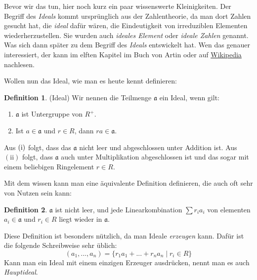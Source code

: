 \documentclass{article}
\theoremstyle{definition}
\newtheorem*{definition}{Definition}
\theoremstyle{remark}
\begin{document}
\vspace{0.7em}
Bevor wir das tun, hier noch kurz ein paar wissenswerte Kleinigkeiten. Der Begriff des \emph{Ideals} kommt
ursprünglich aus der Zahlentheorie, da man dort Zahlen gesucht hat, die \emph{ideal} dafür wären, die
Eindeutigkeit von irreduziblen Elementen wiederherzustellen. Sie wurden auch \emph{ideales Element} oder
\emph{ideale Zahlen} genannt. Was sich dann später zu dem Begriff des \emph{Ideals} entswickelt hat. Wen das
genauer interessiert, der kann im elften Kapitel im Buch von Artin oder auf
\href{https://de.wikipedia.org/wiki/Ideal_(Ringtheorie)#%E2%80%9EIdeale_Zahlen%E2%80%9C}{Wikipedia} nachlesen.

\vspace{0.7em}
Wollen nun das Ideal, wie man es heute kennt definieren:

\begin{definition}(Ideal) Wir nennen die Teilmenge $\mathfrak a$ ein Ideal, wenn gilt:
\begin{enumerate}[label=(\roman*)]
    \item $\mathfrak a$ ist Untergruppe von $R^+$.
    \item Ist $a \in \mathfrak a$ und $r\in R$, dann $ra \in \mathfrak a$.
\end{enumerate}
\end{definition}

Aus $(\text i)$ folgt, dass das $\mathfrak a$ nicht leer und abgeschlossen unter Addition ist. Aus
$(\text{ii})$ folgt, dass $\mathfrak a$ auch unter Multiplikation abgeschlossen ist und das sogar mit einem
beliebigen Ringelement $r\in R$.

\vspace{0.7em}
Mit dem wissen kann man eine äquivalente Definition definieren, die auch oft sehr von Nutzen sein kann:

\begin{definition}
$\mathfrak a$ ist nicht leer, und jede Linearkombination $\sum r_i a_i$ von elementen $a_i\in \mathfrak a$ und
    $r_i\in R$ liegt wieder in $\mathfrak a$.
\end{definition}

Diese Definition ist besonders nützlich, da man Ideale \emph{erzeugen} kann. Dafür ist die folgende
Schreibweise sehr üblich:
\[(a_1,...,a_n)=\{r_1 a_1 + ... + r_n a_n \mid r_i\in R\}\]
Kann man ein Ideal mit einem einzigen Erzeuger ausdrücken, nennt man es auch \emph{Hauptideal}.
\end{document}
